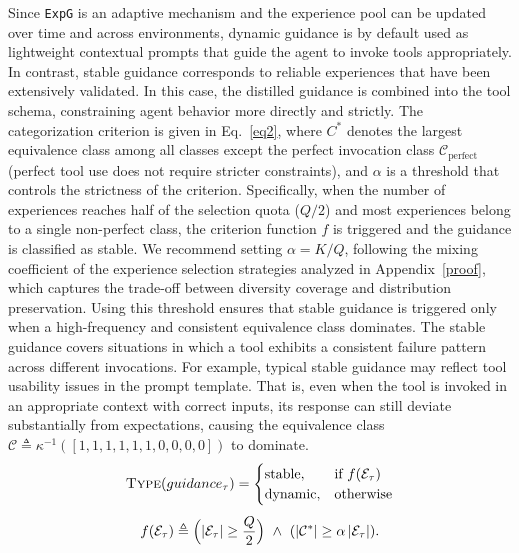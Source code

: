\documentclass[11pt]{article}
\newcommand{\ours}{\texttt{ExpG}}
\begin{document}
Since {\ours} is an adaptive mechanism and the experience pool can be updated over time and across environments, dynamic guidance is by default used as lightweight contextual prompts that guide the agent to invoke tools appropriately. In contrast, stable guidance corresponds to reliable experiences that have been extensively validated. In this case, the distilled guidance is combined into the tool schema, constraining agent behavior more directly and strictly. The categorization criterion is given in Eq.~\ref{eq2}, where $C^{*}$ denotes the largest equivalence class among all classes except the perfect invocation class $\mathcal{C}_{\mathrm{perfect}}$ (perfect tool use does not require stricter constraints), and $\alpha$ is a threshold that controls the strictness of the criterion. Specifically, when the number of experiences reaches half of the selection quota (${Q}/{2}$) and most experiences belong to a single non-perfect class, the criterion function $f$ is triggered and the guidance is classified as stable. We recommend setting $\alpha=K/Q$, following the mixing coefficient of the experience selection strategies analyzed in Appendix~\ref{proof}, which captures the trade-off between diversity coverage and distribution preservation. Using this threshold ensures that stable guidance is triggered only when a high-frequency and consistent equivalence class dominates. The stable guidance covers situations in which a tool exhibits a consistent failure pattern across different invocations. For example, typical stable guidance may reflect tool usability issues in the prompt template. That is, even when the tool is invoked in an appropriate context with correct inputs, its response can still deviate substantially from expectations, causing the equivalence class $\mathcal{C} \triangleq \kappa^{-1}\!\left([1,1,1,1,1,1,0,0,0,0]\right)$ to dominate. 
\begin{equation}
\label{eq2}
\begin{gathered}
\textsc{Type}(guidance_\tau)
=
\begin{cases}
\text{stable}, & \text{if } f(\mathcal{E}_\tau)\\
\text{dynamic}, & \text{otherwise}
\end{cases}\\[4pt]
f(\mathcal{E}_\tau)
\triangleq
\Big(|\mathcal{E}_\tau|\ge \frac{Q}{2}\Big)\ \wedge\ (|\mathcal{C}^*|\ge \alpha\,|\mathcal{E}_\tau|).
\end{gathered}
\end{equation}
\end{document}
